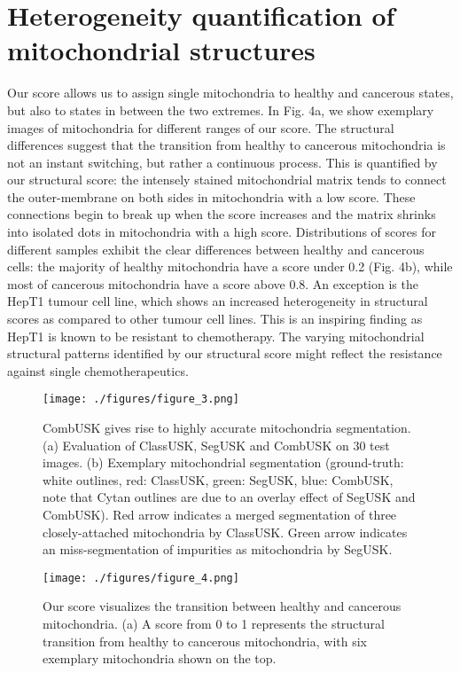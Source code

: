 \section{Heterogeneity quantification of mitochondrial structures}
Our score allows us to assign single mitochondria to healthy and cancerous states, but
also to states in between the two extremes. In Fig. 4a, we show exemplary images of
mitochondria for different ranges of our score. The structural differences suggest that
the transition from healthy to cancerous mitochondria is not an instant switching, but
rather a continuous process. This is quantified by our structural score: the intensely
stained mitochondrial matrix tends to connect the outer-membrane on both sides in
mitochondria with a low score. These connections begin to break up when the score
increases and the matrix shrinks into isolated dots in mitochondria with a high score.
Distributions of scores for different samples exhibit the clear differences between
healthy and cancerous cells: the majority of healthy mitochondria have a score under
0.2 (Fig. 4b), while most of cancerous mitochondria have a score above 0.8. An
exception is the HepT1 tumour cell line, which shows an increased heterogeneity in
structural scores as compared to other tumour cell lines. This is an inspiring finding
as HepT1 is known to be resistant to chemotherapy. The varying mitochondrial
structural patterns identified by our structural score might reflect the resistance
against single chemotherapeutics.

\begin{figure}[ht!]
\texttt{[image: ./figures/figure\_3.png]}
\caption{CombUSK gives rise to highly accurate mitochondria segmentation. (a) Evaluation of ClassUSK, SegUSK and CombUSK on 30 test images. (b) Exemplary mitochondrial segmentation (ground-truth: white outlines, red: ClassUSK, green: SegUSK, blue: CombUSK, note that Cytan outlines are due to an overlay effect of SegUSK and CombUSK). Red arrow indicates a merged segmentation of three closely-attached mitochondria by ClassUSK. Green arrow indicates an miss-segmentation of impurities as mitochondria by SegUSK.}
\end{figure}
\begin{figure}[h!]
\texttt{[image: ./figures/figure\_4.png]}
\caption{Our score visualizes the transition between healthy and cancerous mitochondria. (a) A score from 0 to 1 represents the structural transition from healthy to cancerous mitochondria, with six exemplary mitochondria shown on the top.}
\end{figure}
